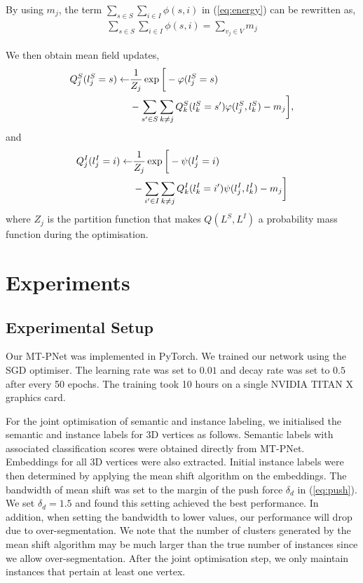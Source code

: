 \documentclass[10pt,twocolumn,letterpaper]{article}
\begin{document}
By using $m_j$, the term $\sum_{s \in S} \sum_{i \in I} \phi(s,i)$ in
(\ref{eq:energy}) can be rewritten as,
\begin{align}
  \sum_{s \in S} \sum_{i \in I} \phi(s,i) = \sum_{v_j \in V} m_j
\end{align}

We then obtain mean field updates,
\begin{align}
  \label{eq:update/semantic}
  Q^S_j(l^S_j=s) \leftarrow &\frac{1}{Z_j} \exp \bigg[ -\varphi(l^S_j=s) \notag \\
                            &-\sum_{s' \in S} \sum_{k \neq j} Q^S_k(l^S_k=s')\varphi(l^S_j,l^S_k)
                              -m_j \bigg],
\end{align}
and
\begin{align}
  \label{eq:update/instance}
  Q^I_j(l^I_j=i) \leftarrow &\frac{1}{Z_j} \exp \bigg[ -\psi(l^I_j=i) \notag \\
                            &-\sum_{i' \in I} \sum_{k \neq j} Q^I_k(l^I_k=i')\psi(l^I_j,l^I_k)
                              -m_j \bigg]
\end{align}
where $Z_j$ is the partition function that makes $Q(L^S,L^I)$ a probability mass
function during the optimisation.
 \section{Experiments}
\label{sec:experiments}

\subsection{Experimental Setup}

Our MT-PNet was implemented in PyTorch. We trained our network using the SGD
optimiser. The learning rate was set to $0.01$ and decay rate was set to $0.5$
after every 50 epochs. The training took 10 hours on a single NVIDIA TITAN X
graphics card.

For the joint optimisation of semantic and instance labeling, we initialised the
semantic and instance labels for 3D vertices as follows. Semantic labels with
associated classification scores were obtained directly from MT-PNet.
Embeddings for all 3D vertices were also extracted. Initial instance labels were
then determined by applying the mean shift algorithm
\cite{comaniciu-meanshift-pami02} on the embeddings. The bandwidth of mean shift
was set to the margin of the push force $\delta_d$ in (\ref{eq:push}). We set
$\delta_d = 1.5$ and found this setting achieved the best performance. In
addition, when setting the bandwidth to lower values, our performance will drop
due to over-segmentation. We note that the number of clusters generated by the
mean shift algorithm may be much larger than the true number of instances since
we allow over-segmentation. After the joint optimisation step, we only maintain
instances that pertain at least one vertex.
\end{document}
